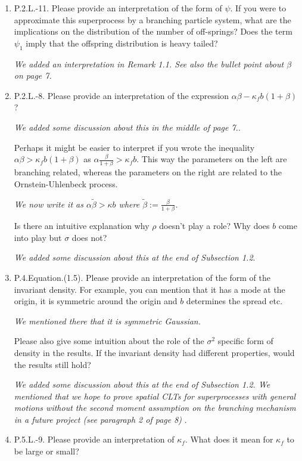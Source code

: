 \documentclass[12pt,a4paper]{amsart}
\begin{document}
\begin{enumerate}
\item
  P.2.L.-11.
  Please provide an interpretation of the form of $\psi$.
  If you were to approximate this superprocess by a branching particle system, what are the implications on the distribution of the number of off-springs?
  Does the term $\psi_1$ imply that the offspring distribution is heavy tailed?

  \emph{We added an interpretation in Remark 1.1.
   See also the bullet point about $\beta$ on page 7.
    }
\item
  P.2.L.-8.
   Please provide an interpretation of the expression $\alpha\beta - \kappa_f b(1+\beta)$?

\emph{We added some discussion about this in the middle of page 7.}.

  Perhaps it might be easier to interpret if you wrote the inequality $\alpha \beta > \kappa_f b(1 + \beta)$ as $\alpha \frac{\beta}{1+\beta} > \kappa_f b$.
  This way the parameters on the left are branching related, whereas the parameters on the right are related to the Ornstein-Uhlenbeck process.

  \emph{We now write it as $\alpha \tilde \beta > \kappa b$ where $\tilde \beta := \frac{\beta}{1+\beta}$.}

  Is there an intuitive explanation why $\rho$ doesn't play a role?
  Why does $b$ come into play but $\sigma$ does not?

  \emph{We added some discussion about this at the end of Subsection 1.2}.
\item
  P.4.Equation.(1.5).
  Please provide an interpretation of the form of the invariant density.
  For example, you can mention that it has a mode at the origin, it is symmetric around the origin and $b$ determines the spread etc.

\emph{We mentioned there that it is symmetric Gaussian.}

  Please also give some intuition about the role of the $\sigma^2$ specific form of density in the results.
  If the invariant density had different properties, would the results still hold?

  \emph{We added some discussion about this at the end of Subsection 1.2.
We mentioned that we hope to prove spatial CLTs for superprocesses with general motions without the second moment assumption
on the branching mechanism in a future project (see paragraph 2 of page 8)
}.
\item
  P.5.L.-9.
  Please provide an interpretation of $\kappa_f$.
  What does it mean for $\kappa_f$ to be large or small?


\end{enumerate}
\end{document}
